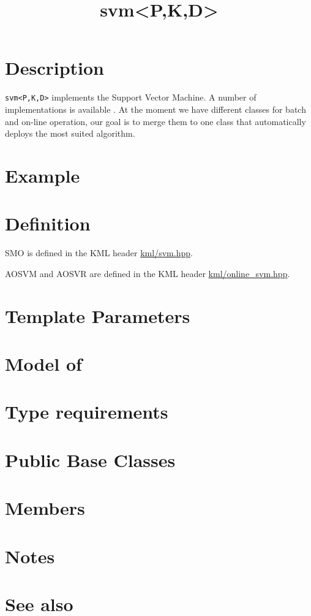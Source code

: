 \documentclass{article}
\begin{document}
\title{svm<P,K,D>}
\maketitle

\section*{Description}

\texttt{svm<P,K,D>} implements the Support Vector Machine. A number of implementations
is available \cite{cauwenberghs00incremental,platt99fast,engel02sparse,ma03accurate}. At the moment we have
different classes for batch and on-line operation, our goal is to 
merge them to one class that automatically deploys the most suited algorithm. 

\section*{Example}
\section*{Definition}


SMO is defined in the KML header \href{\kmlsvnroot/kml/svm.hpp}{kml/svm.hpp}.

\noindent AOSVM and AOSVR are defined in the KML header \href{\kmlsvnroot/kml/online_svm.hpp}{kml/online_svm.hpp}.

\section*{Template Parameters}
\section*{Model of}
\section*{Type requirements}
\section*{Public Base Classes}
\section*{Members}
\section*{Notes}
\section*{See also}



\end{document}
